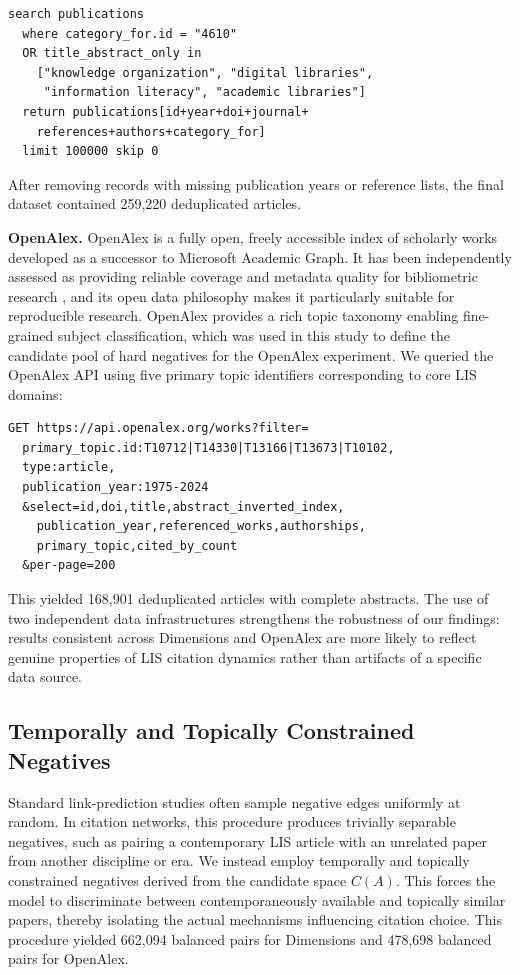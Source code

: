 \documentclass[11pt,a4paper]{article}
\begin{document}
\begin{verbatim}
search publications
  where category_for.id = "4610"
  OR title_abstract_only in
    ["knowledge organization", "digital libraries",
     "information literacy", "academic libraries"]
  return publications[id+year+doi+journal+
    references+authors+category_for]
  limit 100000 skip 0
\end{verbatim}

After removing records with missing publication years or reference lists, the final dataset contained 259,220 deduplicated articles.

\textbf{OpenAlex.} OpenAlex \citep{priem2022openalex} is a fully open, freely accessible index of scholarly works developed as a successor to Microsoft Academic Graph. It has been independently assessed as providing reliable coverage and metadata quality for bibliometric research \citep{delgado2024completeness, nguyen2022quality}, and its open data philosophy makes it particularly suitable for reproducible research. OpenAlex provides a rich topic taxonomy enabling fine-grained subject classification, which was used in this study to define the candidate pool of hard negatives for the OpenAlex experiment. We queried the OpenAlex API using five primary topic identifiers corresponding to core LIS domains:

\begin{verbatim}
GET https://api.openalex.org/works?filter=
  primary_topic.id:T10712|T14330|T13166|T13673|T10102,
  type:article,
  publication_year:1975-2024
  &select=id,doi,title,abstract_inverted_index,
    publication_year,referenced_works,authorships,
    primary_topic,cited_by_count
  &per-page=200
\end{verbatim}

This yielded 168,901 deduplicated articles with complete abstracts. The use of two independent data infrastructures strengthens the robustness of our findings: results consistent across Dimensions and OpenAlex are more likely to reflect genuine properties of LIS citation dynamics rather than artifacts of a specific data source.

\subsection{Temporally and Topically Constrained Negatives}

Standard link-prediction studies often sample negative edges uniformly at random. In citation networks, this procedure produces trivially separable negatives, such as pairing a contemporary LIS article with an unrelated paper from another discipline or era. We instead employ temporally and topically constrained negatives derived from the candidate space \(C(A)\). This forces the model to discriminate between contemporaneously available and topically similar papers, thereby isolating the actual mechanisms influencing citation choice. This procedure yielded 662,094 balanced pairs for Dimensions and 478,698 balanced pairs for OpenAlex.
\end{document}

